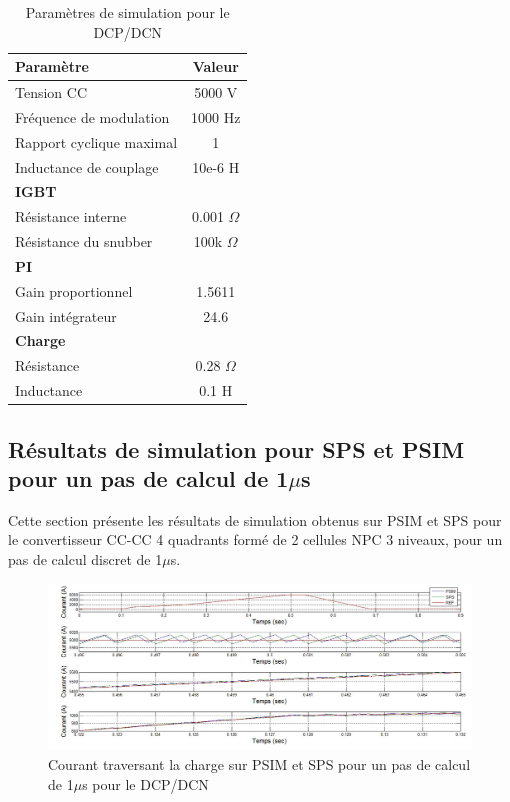 \begin{table}[htb]
\centering
\begin{tabular}{|l|c|} 
  \hline
  \textbf{Paramètre} & \textbf{Valeur}  \\
  \hline\hline
  Tension CC & 5000 V\\ \hline
  Fréquence de modulation & 1000 Hz\\ \hline
  Rapport cyclique maximal & 1 \\ \hline
  Inductance de couplage & 10e-6 H \\ \hline \hline
  \multicolumn{2}{|l|}{\textbf{IGBT}}\\ \hline
  Résistance interne & 0.001 $\Omega$\\
  Résistance du snubber  & 100k $\Omega$\\ \hline \hline
   \multicolumn{2}{|l|}{\textbf{PI}}\\ \hline
  Gain proportionnel & 1.5611 \\
  Gain intégrateur & 24.6 \\ \hline \hline
  \multicolumn{2}{|l|}{\textbf{Charge}}\\ \hline
  Résistance & 0.28 $\Omega$\\
  Inductance & 0.1 H \\
  \hline
\end{tabular}
\caption{Paramètres de simulation pour le DCP/DCN}
\label{p_DCP}
\end{table}
\clearpage


\subsection{Résultats de simulation pour SPS et PSIM pour un pas de calcul de 1$\mu$s}
Cette section présente les résultats de simulation obtenus sur PSIM et SPS pour le convertisseur CC-CC 4 quadrants formé de 2 cellules NPC 3 niveaux, pour un pas de calcul discret de 1$\mu$s.



\begin{figure}[htb]
\centering
\includegraphics[scale=0.5]{fig/DCPDCN/DCPCourantCharge1u.jpg}
\caption{Courant traversant la charge sur PSIM et SPS pour un pas de calcul de 1$\mu$s pour le DCP/DCN}
\label{DC_ch_cou_1}
\end{figure}



